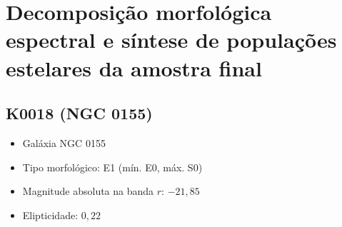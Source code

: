 


\chapter{Decomposição morfológica espectral e síntese de populações estelares
da amostra final}
\label{apendice:Decomp}



\section{K0018 (NGC 0155)}
\label{apendice:Decomp:K0018}

\begin{itemize}
  \item Galáxia NGC 0155
  \item Tipo morfológico: E1 (mín. E0, máx. S0)
  \item Magnitude absoluta na banda $r$: $-21,85$
  \item Elipticidade: $0,22$
\end{itemize}

